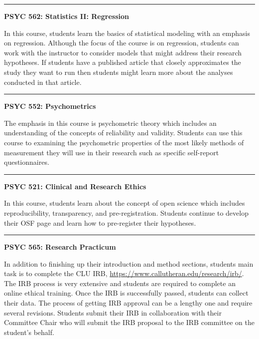 \documentclass[
  openany]{book}
\begin{document}
\begin{center}\rule{0.5\linewidth}{0.5pt}\end{center}

\textbf{PSYC 562: Statistics II: Regression}

In this course, students learn the basics of statistical modeling with an emphasis on regression. Although the focus of the course is on regression, students can work with the instructor to consider models that might address their research hypotheses. If students have a published article that closely approximates the study they want to run then students might learn more about the analyses conducted in that article.

\begin{center}\rule{0.5\linewidth}{0.5pt}\end{center}

\textbf{PSYC 552: Psychometrics}

The emphasis in this course is psychometric theory which includes an understanding of the concepts of reliability and validity. Students can use this course to examining the psychometric properties of the most likely methods of measurement they will use in their research such as specific self-report questionnaires.

\begin{center}\rule{0.5\linewidth}{0.5pt}\end{center}

\textbf{PSYC 521: Clinical and Research Ethics}

In this course, students learn about the concept of open science which includes reproducibility, transparency, and pre-registration. Students continue to develop their OSF page and learn how to pre-register their hypotheses.

\begin{center}\rule{0.5\linewidth}{0.5pt}\end{center}

\textbf{PSYC 565: Research Practicum}

In addition to finishing up their introduction and method sections, students main task is to complete the CLU IRB, \url{https://www.callutheran.edu/research/irb/}. The IRB process is very extensive and students are required to complete an online ethical training. Once the IRB is successfully passed, students can collect their data. The process of getting IRB approval can be a lengthy one and require several revisions. Students submit their IRB in collaboration with their Committee Chair who will submit the IRB proposal to the IRB committee on the student's behalf.
\end{document}
